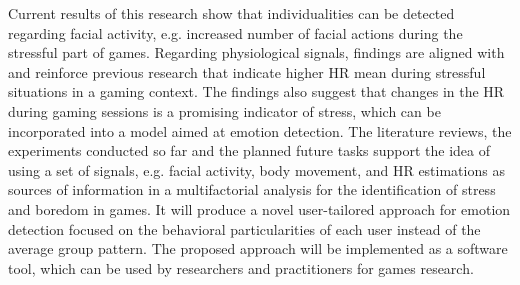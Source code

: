 Current results of this research show that individualities can be detected regarding facial activity, e.g. increased number of facial actions during the stressful part of games. Regarding physiological signals, findings are aligned with and reinforce previous research that indicate higher HR mean during stressful situations in a gaming context. The findings also suggest that changes in the HR during gaming sessions is a promising indicator of stress, which can be incorporated into a model aimed at emotion detection. The literature reviews, the experiments conducted so far and the planned future tasks support the idea of using a set of signals, e.g. facial activity, body movement, and HR estimations as sources of information in a multifactorial analysis for the identification of stress and boredom in games. It will produce a novel user-tailored approach for emotion detection focused on the behavioral particularities of each user instead of the average group pattern. The proposed approach will be implemented as a software tool, which can be used by researchers and practitioners for games research.
